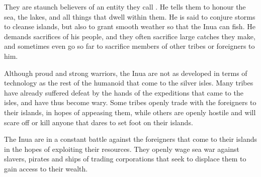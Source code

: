 They are staunch believers of an entity they call .
He tells them to honour the sea, the lakes, and all things that dwell within
them. He is said to conjure storms to cleanse islands, but also to grant
smooth weather so that the Inua can fish. He demands sacrifices of his people,
and they often sacrifice large catches they make, and sometimes even go so
far to sacrifice members of other tribes or foreigners to him.

Although proud and strong warriors, the Inua are not as developed in terms
of technology as the rest of the humanoid that come to the silver isles.
Many tribes have already suffered defeat by the hands of the expeditions
that came to the isles, and have thus become wary. Some tribes openly trade
with the foreigners to their islands, in hopes of appeasing them, while
others are openly hostile and will scare off or kill anyone that dares to
set foot on their islands.

The Inua are in a constant battle against the foreigners that come to their
islands in the hopes of exploiting their resources. They openly wage sea
war against slavers, pirates and ships of trading corporations that seek
to displace them to gain access to their wealth.

